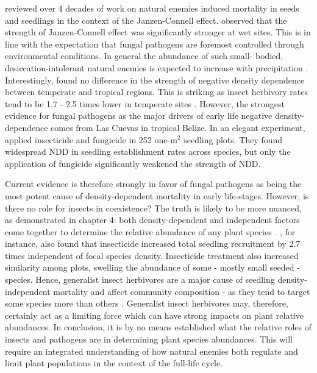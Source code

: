 \documentclass[b5paper,justified]{tufte-book} %
\begin{document}
\begin{fullwidth} 
\hspace{0.5cm} \citet{Comita2014} reviewed over 4 decades of work on natural enemies induced mortality in seeds and seedlings in the context of the Janzen-Connell effect. \citet{Comita2014} observed that the strength of Janzen-Connell effect was significantly stronger at wet sites. This is in line with the expectation that fungal pathogens are foremost controlled through environmental conditions. In general the abundance of such small- bodied, desiccation-intolerant natural enemies is expected to increase with precipitation \citep{Givnish1999}. Interestingly, \citet{Comita2014} found no difference in the strength of negative density dependence between temperate and tropical regions. This is striking as insect herbivory rates tend to be 1.7 - 2.5 times lower in temperate sites \citep{Coley1996}. However, the strongest evidence for fungal pathogens as the major drivers of early life negative density-dependence comes from Las Cuevas in tropical Belize. In an elegant experiment, \citet{Bagchi2014} applied insecticide and fungicide in 252 one-m$^2$ seedling plots. They found widespread NDD in seedling establishment rates across species, but only the application of fungicide significantly weakened the strength of NDD. 

Current evidence is therefore strongly in favor of fungal pathogens as being the most potent cause of density-dependent mortality in early life-stages. However, is there no role for insects in coexistence? The truth is likely to be more nuanced, as demonstrated in chapter 4: both density-dependent and independent factors come together to determine the relative abundance of any plant species \citep[see also][]{Turchin1995}. \citet{Bagchi2014}, for instance, also found that insecticide increased total seedling recruitment by 2.7 times independent of focal species density. Insecticide treatment also increased similarity among plots, swelling the abundance of some - mostly small seeded - species. Hence, generalist insect herbivores are a major cause of seedling density-independent mortality and affect community composition - as they tend to target some species more than others \citep[e.g.][]{Green2014}. Generalist insect herbivores may, therefore, certainly act as a limiting force which can have strong impacts on plant relative abundances. In conclusion, it is by no means established what the relative roles of insects and pathogens are in determining plant species abundances. This will require an integrated understanding of how natural enemies both regulate and limit plant populations in the context of the full-life cycle. 


\end{fullwidth}
\end{document}
